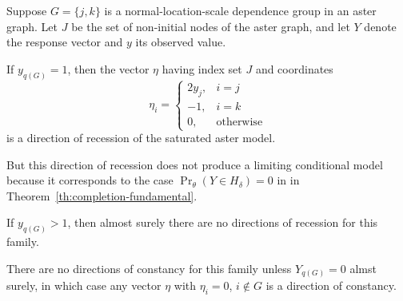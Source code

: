 \begin{theorem} \label{th:dor-normal}
Suppose $G = \{j, k\}$ is a normal-location-scale dependence group
in an aster graph.
Let $J$ be the set of non-initial nodes of the aster graph,
and let $Y$ denote the response vector and $y$ its observed value.

If $y_{q(G)} = 1$, then the vector $\eta$ having index set $J$
and coordinates
\begin{equation} \label{eq:dor-normal}
   \eta_i = \begin{cases} 2 y_j, & i = j \\
   -1, & i = k \\
   0, & \text{otherwise} \end{cases}
\end{equation}
is a direction of recession of the saturated aster model.

But this direction of recession does not produce a limiting conditional model
because it corresponds to the case $\Pr_\theta(Y \in H_\delta) = 0$ in
in Theorem~\ref{th:completion-fundamental}.

If $y_{q(G)} > 1$, then almost surely there are no directions of recession
for this family.

There are no directions of constancy for this family unless $Y_{q(G)} = 0$
almst surely, in which case any vector $\eta$ with $\eta_i = 0$, $i \notin G$
is a direction of constancy.
\end{theorem}
